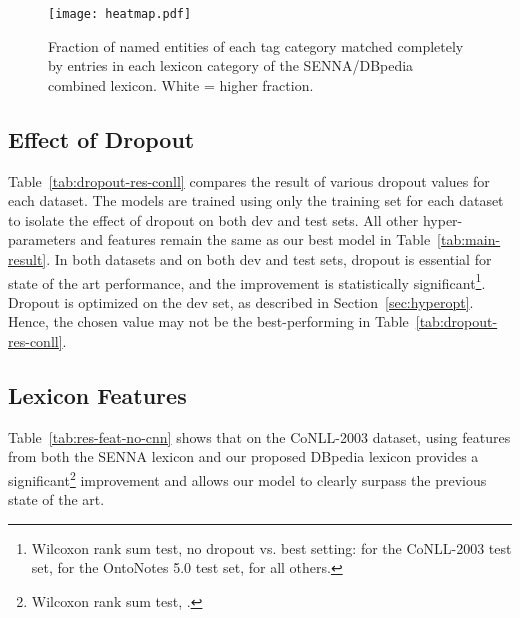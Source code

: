 \documentclass[11pt,letterpaper]{article}
\begin{document}
\begin{figure*}[ht]
\begin{center}
\texttt{[image: heatmap.pdf]} 
\caption{Fraction of named entities of each tag category matched completely by entries in each lexicon category of the SENNA/DBpedia combined lexicon. White = higher fraction.}
\end{center}
\label{fig:lexicon-coverage}
\end{figure*}

\subsection{Effect of Dropout}
\label{sec:dropout-results}

Table~\ref{tab:dropout-res-conll} compares the result of various dropout values for each dataset. The models are trained using only the training set for each dataset to isolate the effect of dropout on both dev and test sets. All other hyper-parameters and features remain the same as our best model in Table~\ref{tab:main-result}. In both datasets and on both dev and test sets, dropout is essential for state of the art performance, and the improvement is statistically significant\footnote{Wilcoxon rank sum test, no dropout vs. best setting:  for the CoNLL-2003 test set,  for the OntoNotes 5.0 test set,  for all others. 
}.
Dropout is optimized on the dev set, as described in Section~\ref{sec:hyperopt}. Hence, the chosen value may not be the best-performing in Table~\ref{tab:dropout-res-conll}.








\subsection{Lexicon Features}
\label{sec:lexicon-results}

Table~\ref{tab:res-feat-no-cnn} shows that on the CoNLL-2003 dataset, using features from both the SENNA lexicon and our proposed DBpedia lexicon provides a significant\footnote{Wilcoxon rank sum test, .} improvement and allows our model to clearly surpass the previous state of the art. 
\end{document}
